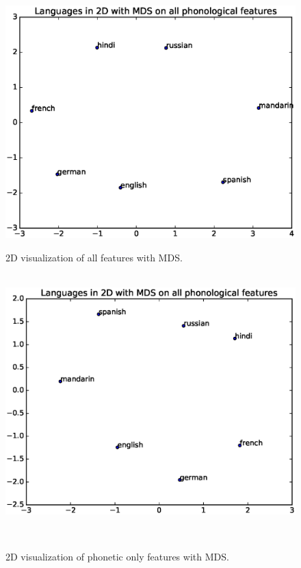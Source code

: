 \begin{figure}[!htb]
\centering
{}
  \includegraphics[width=\linewidth]{figures/all_MDS.eps}
  \caption{2D visualization of all features with MDS.}\label{fig:all_mds}
\endminipage\hfill
\\
  \includegraphics[width=\linewidth]{figures/phono_MDS_wals.eps}
  \caption{2D visualization of phonetic only features with MDS.}\label{fig:phonetic_mds}
\endminipage\hfill
\\
%

\end{figure}
